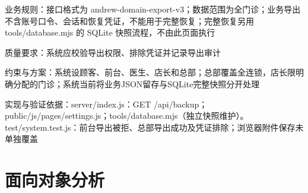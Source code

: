 \documentclass[UTF8,12pt,a4paper,fontset=none]{ctexart}
\begin{document}
业务规则：接口格式为 andrew-domain-export-v3；数据范围为全门诊；业务导出不含账号口令、会话和恢复凭证，不能用于完整恢复；完整恢复另用 tools/\allowbreak{}database.\allowbreak{}mjs 的 SQLite 快照流程，不由此页面执行\par
质量要求：系统应校验导出权限、排除凭证并记录导出审计\par
约束与方案：系统设顾客、前台、医生、店长和总部；总部覆盖全连锁，店长限明确分配的门诊；系统当前将业务JSON留存与SQLite完整快照分开处理\par
实现与验证依据：server/\allowbreak{}index.\allowbreak{}js：GET /\allowbreak{}api/\allowbreak{}backup；public/\allowbreak{}js/\allowbreak{}pages/\allowbreak{}settings.\allowbreak{}js；tools/\allowbreak{}database.\allowbreak{}mjs（独立快照维护）。test/\allowbreak{}system.\allowbreak{}test.\allowbreak{}js：前台导出被拒、总部导出成功及凭证排除；浏览器附件保存未单独覆盖\par
{}
\section{面向对象分析}
\end{document}
